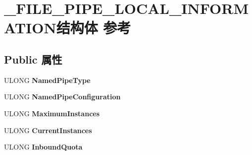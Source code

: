 \hypertarget{struct___f_i_l_e___p_i_p_e___l_o_c_a_l___i_n_f_o_r_m_a_t_i_o_n}{}\section{\+\_\+\+F\+I\+L\+E\+\_\+\+P\+I\+P\+E\+\_\+\+L\+O\+C\+A\+L\+\_\+\+I\+N\+F\+O\+R\+M\+A\+T\+I\+O\+N结构体 参考}
\label{struct___f_i_l_e___p_i_p_e___l_o_c_a_l___i_n_f_o_r_m_a_t_i_o_n}
\subsection*{Public 属性}
\begin{DoxyCompactItemize}
\item 
\mbox{\label{struct___f_i_l_e___p_i_p_e___l_o_c_a_l___i_n_f_o_r_m_a_t_i_o_n_a917af8b23b946e2dfafaab8301b5ec2a}} 
U\+L\+O\+NG {\bfseries Named\+Pipe\+Type}
\item 
\mbox{\label{struct___f_i_l_e___p_i_p_e___l_o_c_a_l___i_n_f_o_r_m_a_t_i_o_n_a11c7fe7265646d473c19bdd0e1ea00a9}} 
U\+L\+O\+NG {\bfseries Named\+Pipe\+Configuration}
\item 
\mbox{\label{struct___f_i_l_e___p_i_p_e___l_o_c_a_l___i_n_f_o_r_m_a_t_i_o_n_a2fc968e78d345b0cc349a5578f5df091}} 
U\+L\+O\+NG {\bfseries Maximum\+Instances}
\item 
\mbox{\label{struct___f_i_l_e___p_i_p_e___l_o_c_a_l___i_n_f_o_r_m_a_t_i_o_n_a720f35ee91deec1391d152fc54deb47d}} 
U\+L\+O\+NG {\bfseries Current\+Instances}
\item 
\mbox{\label{struct___f_i_l_e___p_i_p_e___l_o_c_a_l___i_n_f_o_r_m_a_t_i_o_n_a23adc6d4e4931a70eee64c258b485de4}} 
U\+L\+O\+NG {\bfseries Inbound\+Quota}
\item 
\mbox{\label{struct___f_i_l_e___p_i_p_e___l_o_c_a_l___i_n_f_o_r_m_a_t_i_o_n_a32a36f00f8ef42125c0f33e6ca9b8198}} 

\end{DoxyCompactItemize}
